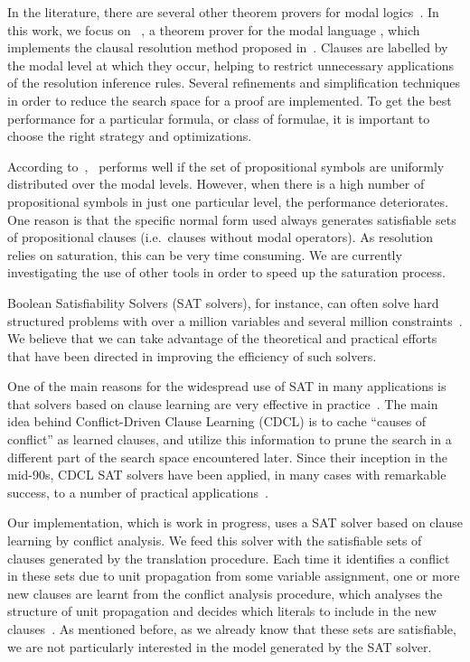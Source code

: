 In the literature, there are several other theorem provers for modal
logics~\cite{hylores,eprover,spass,Vampire}. In this work, we focus on
\ksp~\cite{Nalon2016}, a theorem prover for the modal language
, which implements the clausal resolution method proposed
in~\cite{nalon2015modal}. Clauses are labelled by the modal level at which they
occur, helping to restrict unnecessary applications of the resolution inference
rules. Several refinements and simplification techniques in order to reduce the
search space for a proof are implemented. To get the best performance for a
particular formula, or class of formulae, it is important to choose the right
strategy and optimizations. 

According to~\cite{Nalon2016}, \ksp~performs well if the set of propositional
symbols are uniformly distributed over the modal levels. However, when there is
a high number of propositional symbols in just one particular level, the
performance deteriorates. One reason is that the specific normal form used
always generates satisfiable sets of propositional clauses (i.e.\ clauses
without modal operators). As resolution relies on saturation, this can be very
time consuming. We are currently investigating the use of other tools in order
to speed up the saturation process. 

Boolean Satisfiability Solvers (SAT solvers), for instance, can often solve hard
structured problems with over a million variables and several million
constraints~\cite{satchapter}. We believe that we can take advantage of the
theoretical and practical efforts that have been directed in improving the
efficiency of such solvers. 

One of the main reasons for the widespread use of SAT in many applications is
that solvers based on clause learning are very effective in
practice~\cite{satchapter}. The main idea behind Conflict-Driven Clause Learning
(CDCL) is to cache ``causes of conflict'' as learned clauses, and utilize this
information to prune the search in a different part of the search space
encountered later. Since their inception in the mid-90s, CDCL SAT solvers have
been applied, in many cases with remarkable success, to a number of practical
applications~\cite{cdclchapter}. 

Our implementation, which is work in progress, uses a SAT solver based on clause
learning by conflict analysis. We feed this solver with the satisfiable sets of
clauses generated by the translation procedure. Each time it identifies a
conflict in these sets due to unit propagation from some variable assignment,
one or more new clauses are learnt from the conflict analysis procedure, which
analyses the structure of unit propagation and decides which literals to include
in the new clauses~\cite{cdclchapter}. As mentioned before, as we already know
that these sets are satisfiable, we are not particularly interested in the model
generated by the SAT solver. 


